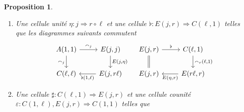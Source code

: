 \documentclass[8pt,a4paper,french,draft]{article}
\newcommand{\To}{\Rightarrow}
\theoremstyle{plain}
\newtheorem{proposition}[theorem]{Proposition}
\theoremstyle{definition}
\theoremstyle{remark}
\begin{document}
\begin{proposition}
\begin{enumerate}[ref=\ref{prop:equiv-radj-car} (\alph*)]
            \[\begin{tikzcd}
                \ar[d, equal] E & \ar[l, loose, "{E(1, j)}"', ""{anchor=center,name=t1}] A \ar[d, equal] & \ar[l, loose, "{E(j, 1)}"', ""{anchor=center,name=t2}] E \ar[d, equal] & \ar[l, loose, "{E(1, r)}"', ""{anchor=center,name=t3}] C \ar[d, equal]\\
                \ar[d, equal] E & \ar[l, loose, "{E(1, r\ell)}", ""{anchor=center,name=b1}] A & \ar[l, loose, "{E(j, 1)}", ""{anchor=center,name=b2}] E & \ar[l, loose, "{E(1, r)}", ""{anchor=center,name=b3}] C \ar[d, equal]\\
                E &&& \ar[lll, loose, "{E(1, r)}", ""{anchor=center,name=bb}] C
                \ar[from=t1, to=b1, draw=none, "{E(1, \eta)}"{anchor=center}] \ar[from=t2, to=b2, draw=none, "="{anchor=center}] \ar[from=t3, to=b3, draw=none, "="{anchor=center}]
                \ar[from=b2, to=bb, draw=none, "{E(1, r), \varepsilon}"{anchor=center}, yshift=-0.8ex]
            \end{tikzcd}
            =
            \begin{tikzcd}
                \ar[d, equal] E & \ar[l, loose, "{E(1, j)}"'] A & \ar[l, loose, "{E(j, 1)}"', ""{anchor=center,name=t}] E & \ar[l, loose, "{E(1, r)}"'] C \ar[d, equal]\\
                E &&& \ar[lll, loose, "{E(1, r)}", ""{anchor=center,name=b}] C
                \ar[from=t, to=b, draw=none, "{\smallsmile_j(1, r)}"{anchor=center}]
            \end{tikzcd}\]
        \item Une cellule unité $\eta : j \To r\circ\ell$ et une cellule $\flat : E(j, r) \To C(\ell, 1)$ telles que les diagrammes suivants commutent
            \[\begin{tikzcd}
                \ar[d, "\smallfrown_j"'] A(1, 1) \ar[r, "\smallfrown_j"] & E(j, j) \ar[d, "{E(j, \eta)}"]\\
                C(\ell, \ell) & \ar[l, "{\flat(1, \ell)}"] E(j, r\ell)
            \end{tikzcd}
            \hspace{10pt}
            \begin{tikzcd}
                \ar[d, equal] E(j, r) \ar[r, "\flat"] & C(\ell, 1) \ar[d, "{\smallfrown_r(\ell, 1)}"]\\
                E(j, r) & \ar[l, "{E(\eta, r)}"] E(r\ell, r)
            \end{tikzcd}\]
        \item Une cellule $\sharp : C(\ell, 1) \To E(j, r)$ et une cellule counité $\varepsilon : C(1, \ell), E(j, r) \To C(1, 1)$ telles que

\end{enumerate}
\end{proposition}
\end{document}
